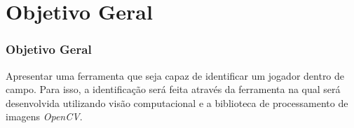 \section{Objetivo Geral}
\begin{frame}
\frametitle{Objetivo Geral}

\begin{block}{}
 Apresentar uma ferramenta que seja capaz de identificar um jogador dentro de campo. Para isso, a identificação será feita através da ferramenta na qual será desenvolvida utilizando visão computacional e a biblioteca de processamento de imagens \textit{OpenCV}.
\end{block}

\end{frame}